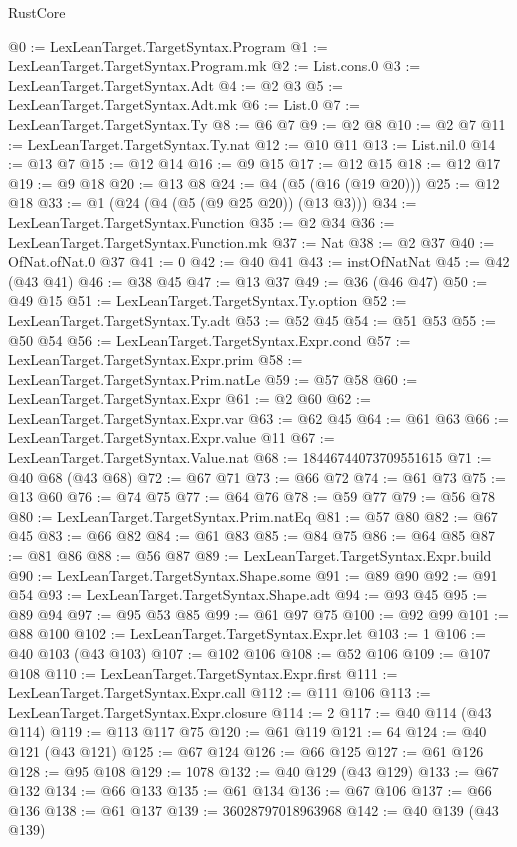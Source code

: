 \begin{lexlean}{RustCore}
\begin{coremodule}
@0 := LexLeanTarget.TargetSyntax.Program
@1 := LexLeanTarget.TargetSyntax.Program.mk
@2 := List.cons.{0}
@3 := LexLeanTarget.TargetSyntax.Adt
@4 := @2 @3
@5 := LexLeanTarget.TargetSyntax.Adt.mk
@6 := List.{0}
@7 := LexLeanTarget.TargetSyntax.Ty
@8 := @6 @7
@9 := @2 @8
@10 := @2 @7
@11 := LexLeanTarget.TargetSyntax.Ty.nat
@12 := @10 @11
@13 := List.nil.{0}
@14 := @13 @7
@15 := @12 @14
@16 := @9 @15
@17 := @12 @15
@18 := @12 @17
@19 := @9 @18
@20 := @13 @8
@24 := @4 (@5 (@16 (@19 @20)))
@25 := @12 @18
@33 := @1 (@24 (@4 (@5 (@9 @25 @20)) (@13 @3)))
@34 := LexLeanTarget.TargetSyntax.Function
@35 := @2 @34
@36 := LexLeanTarget.TargetSyntax.Function.mk
@37 := Nat
@38 := @2 @37
@40 := OfNat.ofNat.{0} @37
@41 := 0
@42 := @40 @41
@43 := instOfNatNat
@45 := @42 (@43 @41)
@46 := @38 @45
@47 := @13 @37
@49 := @36 (@46 @47)
@50 := @49 @15
@51 := LexLeanTarget.TargetSyntax.Ty.option
@52 := LexLeanTarget.TargetSyntax.Ty.adt
@53 := @52 @45
@54 := @51 @53
@55 := @50 @54
@56 := LexLeanTarget.TargetSyntax.Expr.cond
@57 := LexLeanTarget.TargetSyntax.Expr.prim
@58 := LexLeanTarget.TargetSyntax.Prim.natLe
@59 := @57 @58
@60 := LexLeanTarget.TargetSyntax.Expr
@61 := @2 @60
@62 := LexLeanTarget.TargetSyntax.Expr.var
@63 := @62 @45
@64 := @61 @63
@66 := LexLeanTarget.TargetSyntax.Expr.value @11
@67 := LexLeanTarget.TargetSyntax.Value.nat
@68 := 18446744073709551615
@71 := @40 @68 (@43 @68)
@72 := @67 @71
@73 := @66 @72
@74 := @61 @73
@75 := @13 @60
@76 := @74 @75
@77 := @64 @76
@78 := @59 @77
@79 := @56 @78
@80 := LexLeanTarget.TargetSyntax.Prim.natEq
@81 := @57 @80
@82 := @67 @45
@83 := @66 @82
@84 := @61 @83
@85 := @84 @75
@86 := @64 @85
@87 := @81 @86
@88 := @56 @87
@89 := LexLeanTarget.TargetSyntax.Expr.build
@90 := LexLeanTarget.TargetSyntax.Shape.some
@91 := @89 @90
@92 := @91 @54
@93 := LexLeanTarget.TargetSyntax.Shape.adt
@94 := @93 @45
@95 := @89 @94
@97 := @95 @53 @85
@99 := @61 @97 @75
@100 := @92 @99
@101 := @88 @100
@102 := LexLeanTarget.TargetSyntax.Expr.let
@103 := 1
@106 := @40 @103 (@43 @103)
@107 := @102 @106
@108 := @52 @106
@109 := @107 @108
@110 := LexLeanTarget.TargetSyntax.Expr.first
@111 := LexLeanTarget.TargetSyntax.Expr.call
@112 := @111 @106
@113 := LexLeanTarget.TargetSyntax.Expr.closure
@114 := 2
@117 := @40 @114 (@43 @114)
@119 := @113 @117 @75
@120 := @61 @119
@121 := 64
@124 := @40 @121 (@43 @121)
@125 := @67 @124
@126 := @66 @125
@127 := @61 @126
@128 := @95 @108
@129 := 1078
@132 := @40 @129 (@43 @129)
@133 := @67 @132
@134 := @66 @133
@135 := @61 @134
@136 := @67 @106
@137 := @66 @136
@138 := @61 @137
@139 := 36028797018963968
@142 := @40 @139 (@43 @139)

\end{coremodule}
\end{lexlean}
